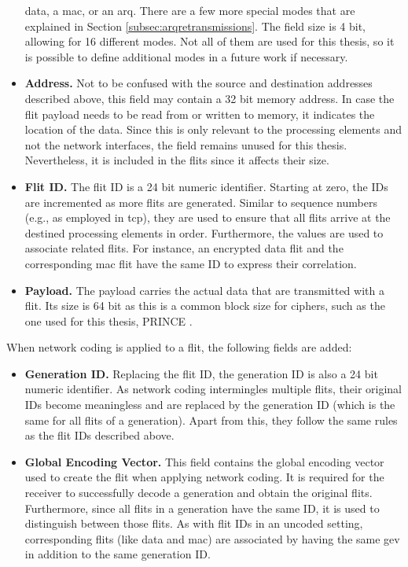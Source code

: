 \begin{itemize}
        data, a \gls{mac}, or an \gls{arq}. There are a few more special modes that are explained in Section \ref{subsec:arqretransmissions}. The
        field size is 4 bit, allowing for 16 different modes. Not all of them are used for this thesis, so it is possible to define additional modes
        in a future work if necessary.
    \item \textbf{Address.} Not to be confused with the source and destination addresses described above, this field may contain a 32 bit memory
        address. In case the flit payload needs to be read from or written to memory, it indicates the location of the data. Since this is only
        relevant to the processing elements and not the network interfaces, the field remains unused for this thesis. Nevertheless, it is included in
        the flits since it affects their size.
    \item \textbf{Flit ID.} The flit ID is a 24 bit numeric identifier. Starting at zero, the IDs are incremented as more flits are generated.
        Similar to sequence numbers (e.g., as employed in \gls{tcp}), they are used to ensure that all flits arrive at the destined processing
        elements in order. Furthermore, the values are used to associate related flits. For instance, an encrypted data flit and the corresponding \gls{mac}
        flit have the same ID to express their correlation.
    \item \textbf{Payload.} The payload carries the actual data that are transmitted with a flit. Its size is 64 bit as this is a common block size
        for ciphers, such as the one used for this thesis, PRINCE \cite{borghoff12prince}.
\end{itemize}
\vspace{0.5\baselineskip}

When network coding is applied to a flit, the following fields are added:
\begin{itemize}
    \item \textbf{Generation ID.} Replacing the flit ID, the generation ID is also a 24 bit numeric identifier. As network coding intermingles multiple
        flits, their original IDs become meaningless and are replaced by the generation ID (which is the same for all flits of a generation). Apart
        from this, they follow the same rules as the flit IDs described above.
    \item \textbf{Global Encoding Vector.} This field contains the global encoding vector used to create the flit when applying network coding. It is
        required for the receiver to successfully decode a generation and obtain the original flits. Furthermore, since all flits in a generation have
        the same ID, it is used to distinguish between those flits. As with flit IDs in an uncoded setting, corresponding flits (like data and
        \gls{mac}) are associated by having the same \gls{gev} in addition to the same generation ID.
\end{itemize}
\vspace{0.5\baselineskip}

